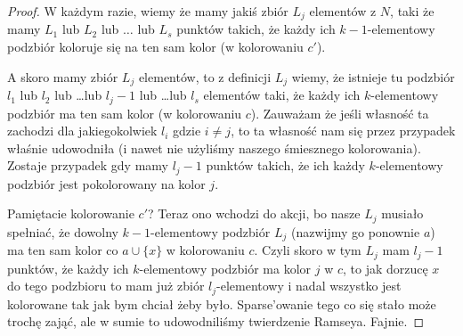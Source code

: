 \begin{proof}
        W każdym razie, wiemy że mamy jakiś zbiór $L_j$ elementów z $N$, taki że mamy $L_1$ lub $L_2$ lub $\dots$ lub $L_s$ punktów takich, że każdy ich $k-1$-elementowy podzbiór koloruje się na ten sam kolor (w kolorowaniu $c'$).
        
        A skoro mamy zbiór $L_j$ elementów, to z definicji $L_j$ wiemy, że istnieje tu podzbiór $l_1$ lub $l_2$ lub \dots lub $l_j - 1$ lub \dots lub $l_s$ elementów taki, że każdy ich $k$-elementowy podzbiór ma ten sam kolor (w kolorowaniu $c$). Zauważam że jeśli własność ta zachodzi dla jakiegokolwiek $l_i$ gdzie $i \not = j$, to ta własność nam się przez przypadek właśnie udowodniła (i nawet nie użyliśmy naszego śmiesznego kolorowania). Zostaje przypadek gdy mamy $l_j - 1$ punktów takich, że ich każdy $k$-elementowy podzbiór jest pokolorowany na kolor $j$.

        Pamiętacie kolorowanie $c'$? Teraz ono wchodzi do akcji, bo nasze $L_j$ musiało spełniać, że dowolny $k-1$-elementowy podzbiór $L_j$ (nazwijmy go ponownie $a$) ma ten sam kolor co $a \cup \{x\}$ w kolorowaniu $c$. Czyli skoro w tym $L_j$ mam $l_j - 1$ punktów, że każdy ich $k$-elementowy podzbiór ma kolor $j$ w $c$, to jak dorzucę $x$ do tego podzbioru to mam już zbiór $l_j$-elementowy i nadal wszystko jest kolorowane tak jak bym chciał żeby było. Sparse'owanie tego co się stało może trochę zająć, ale w sumie to udowodniliśmy twierdzenie Ramseya. Fajnie.  
    \end{proof}
  